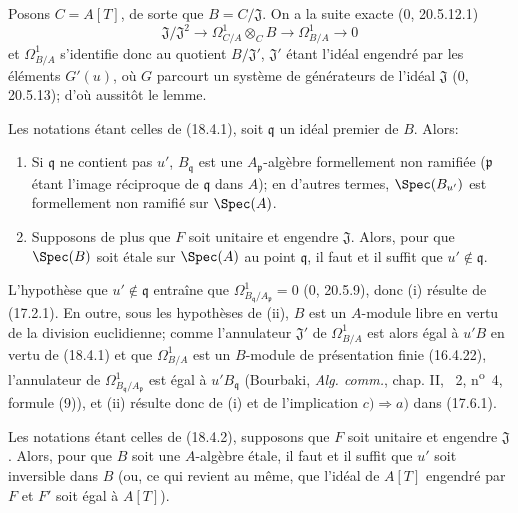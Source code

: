 Posons $C=A[T]$, de sorte que $B=C/\mathfrak J$. On a la suite exacte (0, 20.5.12.1)
\[
  \mathfrak J/\mathfrak J^2\longrightarrow\Omega^1_{C/A}\otimes_C B\longrightarrow\Omega^1_{B/A}\longrightarrow 0
\]
et $\Omega^1_{B/A}$ s'identifie donc au quotient $B/\mathfrak J'$, $\mathfrak J'$ étant l'idéal engendré par les éléments $G'(u)$, où $G$ parcourt un système de générateurs de l'idéal $\mathfrak J$ (0, 20.5.13); d'où aussitôt le lemme.

\begin{proposition}[18.4.2]
\label{IV.18.4.2}
Les notations étant celles de (18.4.1), soit $\mathfrak q$ un idéal premier de $B$. Alors:
\begin{enumerate}
  \item[(i)] Si $\mathfrak q$ ne contient pas $u'$, $B_{\mathfrak q}$ est une $A_{\mathfrak p}$-algèbre formellement non ramifiée ($\mathfrak p$ étant l'image réciproque de $\mathfrak q$ dans $A$); en d'autres termes, $\Spec(B_{u'})$ est formellement non ramifié sur $\Spec(A)$.
  \item[(ii)] Supposons de plus que $F$ soit unitaire et engendre $\mathfrak J$. Alors, pour que $\Spec(B)$ soit étale sur $\Spec(A)$ au point $\mathfrak q$, il faut et il suffit que $u'\notin\mathfrak q$.
\end{enumerate}
\end{proposition}

L'hypothèse que $u'\notin\mathfrak q$ entraîne que $\Omega^1_{B_{\mathfrak q}/A_{\mathfrak p}}=0$ (0, 20.5.9), donc (i) résulte de (17.2.1). En outre, sous les hypothèses de (ii), $B$ est un $A$-module libre en vertu de la division euclidienne; comme l'annulateur $\mathfrak J'$ de $\Omega^1_{B/A}$ est alors égal à $u'B$ en vertu de (18.4.1) et que $\Omega^1_{B/A}$ est un $B$-module de présentation finie (16.4.22), l'annulateur de $\Omega^1_{B_{\mathfrak q}/A_{\mathfrak p}}$ est égal à $u'B_{\mathfrak q}$ (Bourbaki, \emph{Alg. comm.}, chap. II, \textsection~2, n\textsuperscript{o}~4, formule (9)), et (ii) résulte donc de (i) et de l'implication $c)\Rightarrow a)$ dans (17.6.1).

\begin{corollary}[18.4.3]
Les notations étant celles de (18.4.2), supposons que $F$ soit unitaire et engendre $\mathfrak J$. Alors, pour que $B$ soit une $A$-algèbre étale, il faut et il suffit que $u'$ soit inversible dans $B$ (ou, ce qui revient au même, que l'idéal de $A[T]$ engendré par $F$ et $F'$ soit égal à $A[T]$).
\end{corollary}


